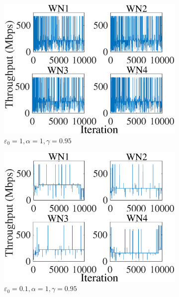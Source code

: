 \documentclass{article}
\begin{document}
	\begin{figure}[]
		\centering
		\begin{subfigure}[b]{0.225\textwidth}
			\includegraphics[width=\textwidth]{images/e_1_a1_g095_ind_tpt}
			\caption{$\varepsilon_0=1, \alpha=1, \gamma=0.95$}
			\label{fig:e_1_a1_g095_ind_tpt}
		\end{subfigure}
		\begin{subfigure}[b]{0.225\textwidth}
			\includegraphics[width=\textwidth]{images/e_01_a_1_g_095_ind_tpt}
			\caption{$\varepsilon_0=0.1, \alpha=1, \gamma=0.95$}
			\label{fig:e_1_a_1_g_095_ind_tpt}
		\end{subfigure}
		\begin{subfigure}[b]{0.225\textwidth}

\end{subfigure}
\end{figure}
\end{document}
